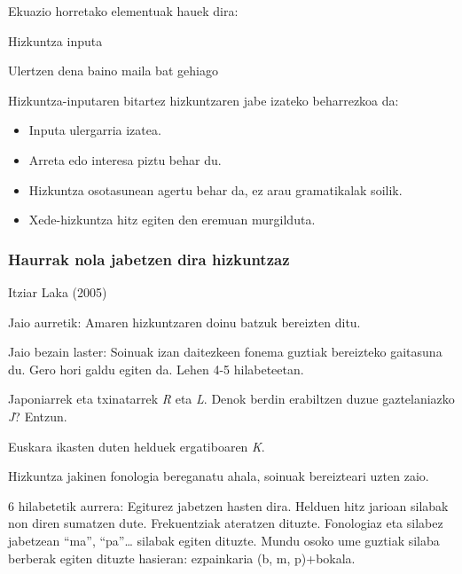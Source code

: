 \documentclass[
]{book}
\providecommand{\tightlist}{%
  \setlength{\itemsep}{0pt}\setlength{\parskip}{0pt}}
\begin{document}
Ekuazio horretako elementuak hauek dira:

\begin{description}
\tightlist
\item[I]
Hizkuntza inputa
\item[+1]
Ulertzen dena baino maila bat gehiago
\end{description}

Hizkuntza-inputaren bitartez hizkuntzaren jabe izateko beharrezkoa da:

\begin{itemize}
\tightlist
\item
  Inputa ulergarria izatea.
\item
  Arreta edo interesa piztu behar du.
\item
  Hizkuntza osotasunean agertu behar da, ez arau gramatikalak soilik.
\item
  Xede-hizkuntza hitz egiten den eremuan murgilduta.
\end{itemize}

\hypertarget{haurrak-nola-jabetzen-dira-hizkuntzaz}{%
\subsubsection{Haurrak nola jabetzen dira hizkuntzaz}\label{haurrak-nola-jabetzen-dira-hizkuntzaz}}

Itziar Laka (2005)

Jaio aurretik: Amaren hizkuntzaren doinu batzuk bereizten ditu.

Jaio bezain laster: Soinuak izan daitezkeen fonema guztiak bereizteko gaitasuna du. Gero hori galdu egiten da. Lehen 4-5 hilabeteetan.

\begin{description}
\tightlist
\item[Adibideak]
Japoniarrek eta txinatarrek \emph{R} eta \emph{L}. Denok berdin erabiltzen duzue gaztelaniazko \emph{J}? Entzun.

Euskara ikasten duten helduek ergatiboaren \emph{K}.
\end{description}

Hizkuntza jakinen fonologia bereganatu ahala, soinuak bereizteari uzten zaio.

6 hilabetetik aurrera: Egiturez jabetzen hasten dira. Helduen hitz jarioan silabak non diren sumatzen dute. Frekuentziak ateratzen dituzte. Fonologiaz eta silabez jabetzean ``ma'', ``pa''\ldots{} silabak egiten dituzte. Mundu osoko ume guztiak silaba berberak egiten dituzte hasieran: ezpainkaria (b, m, p)+bokala.
\end{document}
